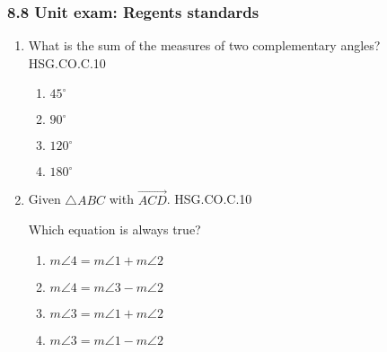 

\fancyhead[LE]{\thepage}



\subsubsection*{8.8 Unit exam: Regents standards}
\begin{enumerate}
\item What is the sum of the measures of two complementary angles? \hfill HSG.CO.C.10
\begin{multicols}{2}
\begin{enumerate}
  \item $45^\circ$
  \item $90^\circ$
  \item $120^\circ$
  \item $180^\circ$
\end{enumerate}
\end{multicols}

\item Given $\triangle ABC$ with $\overrightarrow{ACD}$. \hfill HSG.CO.C.10
\begin{center}
\end{center}
Which equation is always true?
\begin{multicols}{2}
\begin{enumerate}
  \item $m\angle 4 = m\angle 1 + m\angle 2$
  \item $m\angle 4 = m\angle 3 - m\angle 2$
  \item $m\angle 3 = m\angle 1 + m\angle 2$
  \item $m\angle 3 = m\angle 1 - m\angle 2$ 
\end{enumerate}
\end{multicols}


\end{enumerate}
